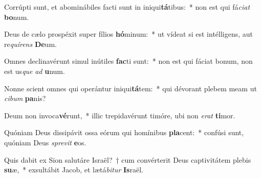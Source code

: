 \item Corrúpti sunt, et abominábiles facti sunt in iniqui\textbf{tá}tibus:~* non est qui fá\textit{ci}\textit{at} \textbf{bo}num.
\item Deus de cælo prospéxit super fílios \textbf{hó}minum:~* ut vídeat si est intélligens, aut re\textit{quí}\textit{rens} \textbf{De}um.
\item Omnes declinavérunt simul inútiles \textbf{fac}ti sunt:~* non est qui fáciat bonum, non est us\textit{que} \textit{ad} \textbf{u}num.
\item Nonne scient omnes qui operántur iniqui\textbf{tá}tem:~* qui dévorant plebem meam ut \textit{ci}\textit{bum} \textbf{pa}nis?
\item Deum non invoca\textbf{vé}runt,~* illic trepidavérunt timóre, ubi non \textit{e}\textit{rat} \textbf{ti}mor.
\item Quóniam Deus dissipávit ossa eórum qui homínibus \textbf{pla}cent:~* confúsi sunt, quóniam Deus \textit{spre}\textit{vit} \textbf{e}os.
\item Quis dabit ex Sion salutáre Israël?~† cum convérterit Deus captivitátem plebis \textbf{su}æ,~* exsultábit Jacob, et lætá\textit{bi}\textit{tur} \textbf{Is}raël.
